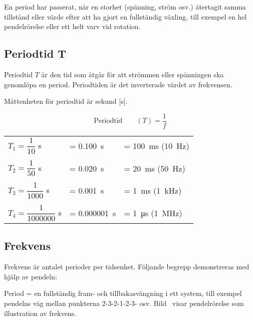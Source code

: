 En period har passerat, när en storhet (spänning, ström osv.) återtagit samma
tillstånd eller värde efter att ha gjort en fullständig växling, till exempel en
hel pendelrörelse eller ett helt varv vid rotation.

\newpage
\subsection{Periodtid T}

Periodtid \(T\) är den tid som åtgår för att strömmen eller spänningen ska
genomlöpa en period. Periodtiden är det inverterade värdet av frekvensen.

Måttenheten för periodtid är sekund [s].

$$\text{Periodtid} \qquad (T) = \dfrac{1}{f}$$

\begin{exempelbox}
\begin{small}
\begin{tabular}{@{}lll}
\(T_1=\dfrac{1}{10}\) s & = \qty{0,100}{\second} & = \qty{100}{\milli\second} (\qty{10}{\hertz})\\
\\
\(T_2=\dfrac{1}{50}\) s & = \qty{0,020}{\second} & = \qty{20}{\milli\second} (\qty{50}{\hertz})\\
\\
\(T_3=\dfrac{1}{1000}\) s & = \qty{0,001}{\second} & = \qty{1}{\milli\second} (\qty{1}{\kilo\hertz})\\
\\
\(T_4=\dfrac{1}{1000000}\) s & = \qty{0,000001}{\second} & = \qty{1}{\micro\second} (\qty{1}{\mega\hertz})\\
\end{tabular}
\end{small}
\end{exempelbox}

\subsection{Frekvens}
\label{frekvens}

Frekvens är antalet perioder per tidsenhet.
Följande begrepp demonstreras med hjälp av pendeln:

Period = en fullständig fram- och tillbakasvängning i ett system, till exempel
pendelns väg mellan punkterna 2-3-2-1-2-3- osv.
Bild~ visar pendelrörelse som illustration av frekvens.

